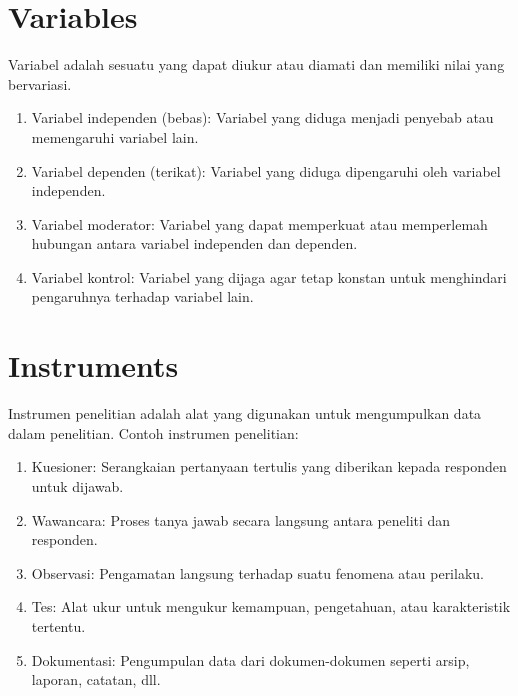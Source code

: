 \documentclass[english,12pt,a4paper]{book}
\begin{document}
\section{Variables}
Variabel adalah sesuatu yang dapat diukur atau diamati dan memiliki nilai yang bervariasi.
\begin{enumerate}
	\item Variabel independen (bebas): Variabel yang diduga menjadi penyebab atau memengaruhi variabel lain.
	\item Variabel dependen (terikat): Variabel yang diduga dipengaruhi oleh variabel independen.
	\item Variabel moderator: Variabel yang dapat memperkuat atau memperlemah hubungan antara variabel independen dan dependen.
	\item Variabel kontrol: Variabel yang dijaga agar tetap konstan untuk menghindari pengaruhnya terhadap variabel lain.
\end{enumerate}
\section{Instruments}
Instrumen penelitian adalah alat yang digunakan untuk mengumpulkan data dalam penelitian. Contoh instrumen penelitian:
\begin{enumerate}
	\item Kuesioner: Serangkaian pertanyaan tertulis yang diberikan kepada responden untuk dijawab.
	\item Wawancara: Proses tanya jawab secara langsung antara peneliti dan responden.
	\item Observasi: Pengamatan langsung terhadap suatu fenomena atau perilaku.
	\item Tes: Alat ukur untuk mengukur kemampuan, pengetahuan, atau karakteristik tertentu.
	\item Dokumentasi: Pengumpulan data dari dokumen-dokumen seperti arsip, laporan, catatan, dll.
\end{enumerate}
\end{document}
